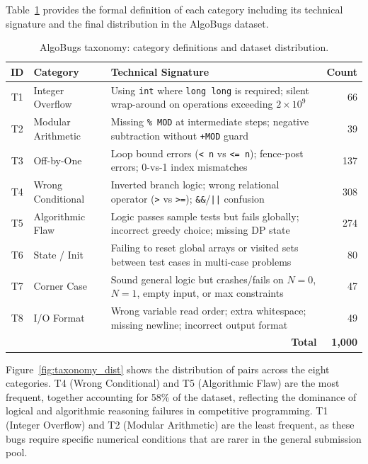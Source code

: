 Table~\ref{tab:taxonomy_detail} provides the formal definition of each category including its technical signature and the final distribution in the AlgoBugs dataset.

\begin{table}[h!]
\centering
\caption{AlgoBugs taxonomy: category definitions and dataset distribution.}
\label{tab:taxonomy_detail}
\renewcommand{\arraystretch}{1.25}
\begin{tabular}{clp{6.5cm}r}
\toprule
\textbf{ID} & \textbf{Category} & \textbf{Technical Signature} & \textbf{Count} \\
\midrule
T1 & Integer Overflow    & Using \texttt{int} where \texttt{long long} is required; silent wrap-around on operations exceeding $2\times10^9$ & 66 \\
T2 & Modular Arithmetic  & Missing \texttt{\% MOD} at intermediate steps; negative subtraction without \texttt{+MOD} guard & 39 \\
T3 & Off-by-One          & Loop bound errors (\texttt{< n} vs \texttt{<= n}); fence-post errors; 0-vs-1 index mismatches & 137 \\
T4 & Wrong Conditional   & Inverted branch logic; wrong relational operator (\texttt{>} vs \texttt{>=}); \texttt{\&\&}/\texttt{||} confusion & 308 \\
T5 & Algorithmic Flaw    & Logic passes sample tests but fails globally; incorrect greedy choice; missing DP state & 274 \\
T6 & State / Init        & Failing to reset global arrays or visited sets between test cases in multi-case problems & 80 \\
T7 & Corner Case         & Sound general logic but crashes/fails on $N{=}0$, $N{=}1$, empty input, or max constraints & 47 \\
T8 & I/O Format          & Wrong variable read order; extra whitespace; missing newline; incorrect output format & 49 \\
\midrule
\multicolumn{3}{r}{\textbf{Total}} & \textbf{1,000} \\
\bottomrule
\end{tabular}
\end{table}

Figure~\ref{fig:taxonomy_dist} shows the distribution of pairs across the eight categories. T4 (Wrong Conditional) and T5 (Algorithmic Flaw) are the most frequent, together accounting for 58\% of the dataset, reflecting the dominance of logical and algorithmic reasoning failures in competitive programming. T1 (Integer Overflow) and T2 (Modular Arithmetic) are the least frequent, as these bugs require specific numerical conditions that are rarer in the general submission pool.


